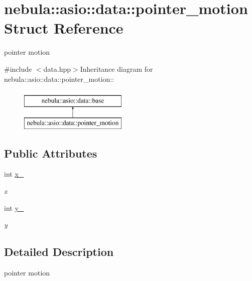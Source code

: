 \hypertarget{structnebula_1_1asio_1_1data_1_1pointer__motion}{
\section{nebula::asio::data::pointer\_\-motion Struct Reference}
\label{structnebula_1_1asio_1_1data_1_1pointer__motion}
}


pointer motion  


{\ttfamily \#include $<$data.hpp$>$}Inheritance diagram for nebula::asio::data::pointer\_\-motion::\begin{figure}[H]
\begin{center}
\leavevmode
\includegraphics[height=2cm]{structnebula_1_1asio_1_1data_1_1pointer__motion}
\end{center}
\end{figure}
\subsection*{Public Attributes}
\begin{DoxyCompactItemize}
\item 
int \hyperlink{structnebula_1_1asio_1_1data_1_1pointer__motion_a9e7fd45ca37252a94006e8faf5450f21}{x\_\-}
\begin{DoxyCompactList}\small\item\em x \item\end{DoxyCompactList}\item 
int \hyperlink{structnebula_1_1asio_1_1data_1_1pointer__motion_ae45e0e97152395dfb570e89b39e5edb9}{y\_\-}
\begin{DoxyCompactList}\small\item\em y \item\end{DoxyCompactList}\end{DoxyCompactItemize}


\subsection{Detailed Description}
pointer motion 

